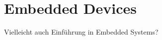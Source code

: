 \section{Embedded Devices}
\label{sec:embedded_devices}

Vielleicht auch Einführung in Embedded Systems?















